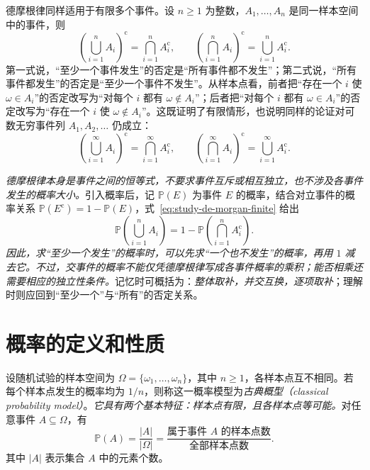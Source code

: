 \documentclass[UTF8,12pt,a4paper,fontset=fandol]{ctexbook}
\begin{document}
德摩根律同样适用于有限多个事件。设 $n\ge1$ 为整数，$A_1,\ldots,A_n$ 是同一样本空间中的事件，则
\begin{equation}
  \left(\bigcup_{i=1}^{n}A_i\right)^{\mathrm c}
    =\bigcap_{i=1}^{n}A_i^{\mathrm c},
  \qquad
  \left(\bigcap_{i=1}^{n}A_i\right)^{\mathrm c}
    =\bigcup_{i=1}^{n}A_i^{\mathrm c}.
  \label{eq:study-de-morgan-finite}
\end{equation}
第一式说，“至少一个事件发生”的否定是“所有事件都不发生”；第二式说，“所有事件都发生”的否定是“至少一个事件不发生”。从样本点看，前者把“存在一个 $i$ 使 $\omega\in A_i$”的否定改写为“对每个 $i$ 都有 $\omega\notin A_i$”；后者把“对每个 $i$ 都有 $\omega\in A_i$”的否定改写为“存在一个 $i$ 使 $\omega\notin A_i$”。这既证明了有限情形，也说明同样的论证对可数无穷事件列 $A_1,A_2,\ldots$ 仍成立：
\begin{equation}
  \left(\bigcup_{i=1}^{\infty}A_i\right)^{\mathrm c}
    =\bigcap_{i=1}^{\infty}A_i^{\mathrm c},
  \qquad
  \left(\bigcap_{i=1}^{\infty}A_i\right)^{\mathrm c}
    =\bigcup_{i=1}^{\infty}A_i^{\mathrm c}.
  \label{eq:study-de-morgan-countable}
\end{equation}

\emph{德摩根律本身是\emph{事件之间的恒等式}，不要求事件互斥或相互独立，也不涉及各事件发生的概率大小。}引入概率后，记 $\mathbb P(E)$ 为事件 $E$ 的概率，结合对立事件的概率关系 $\mathbb P(E^{\mathrm c})=1-\mathbb P(E)$，式~\eqref{eq:study-de-morgan-finite} 给出
\begin{equation}
  \mathbb P\!\left(\bigcup_{i=1}^{n}A_i\right)
    =1-\mathbb P\!\left(\bigcap_{i=1}^{n}A_i^{\mathrm c}\right).
  \label{eq:study-de-morgan-probability}
\end{equation}
\emph{因此，求“至少一个发生”的概率时，可以先求“一个也不发生”的概率，再用 $1$ 减去它。}\emph{不过，交事件的概率不能仅凭德摩根律写成各事件概率的乘积；能否相乘还需要相应的独立性条件。}记忆时可概括为：\emph{整体取补，并交互换，逐项取补}；理解时则应回到“至少一个”与“所有”的否定关系。

\section{概率的定义和性质}
\label{sec:study-probability-definition}

\begin{definition}
\label{def:study-classical-probability}
设随机试验的样本空间为 $\Omega=\{\omega_1,\ldots,\omega_n\}$，其中 $n\ge1$，各样本点互不相同。若每个样本点发生的概率均为 $1/n$，则称这一概率模型为\emph{古典概型（classical probability model）}。\emph{它具有两个基本特征：样本点有限，且各样本点等可能。}对任意事件 $A\subseteq\Omega$，有
\begin{equation}
  \mathbb P(A)=\frac{|A|}{|\Omega|}
  =\frac{\text{属于事件 }A\text{ 的样本点数}}{\text{全部样本点数}}.
  \label{eq:study-classical-probability}
\end{equation}
其中 $|A|$ 表示集合 $A$ 中的元素个数。
\end{definition}
\end{document}
